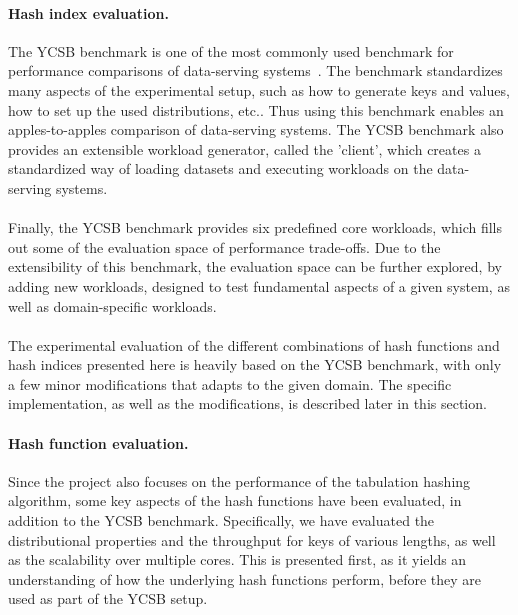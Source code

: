 \documentclass[11pt]{article} %
\begin{document}
\paragraph{Hash index evaluation.} The YCSB benchmark is one of the most commonly used benchmark for performance comparisons of data-serving systems~\cite{BC10}. The benchmark standardizes many aspects of the experimental setup, such as how to generate keys and values, how to set up the used distributions, etc.. Thus using this benchmark enables an apples-to-apples comparison of data-serving systems. The YCSB benchmark also provides an extensible workload generator, called the 'client', which creates a standardized way of loading datasets and executing workloads on the data-serving systems. \\
\\
Finally, the YCSB benchmark provides six predefined core workloads, which fills out some of the evaluation space of performance trade-offs. Due to the extensibility of this benchmark, the evaluation space can be further explored, by adding new workloads, designed to test fundamental aspects of a given system, as well as domain-specific workloads.\\
\\
The experimental evaluation of the different combinations of hash functions and hash indices presented here is heavily based on the YCSB benchmark, with only a few minor modifications that adapts to the given domain. The specific implementation, as well as the modifications, is described later in this section.
\paragraph{Hash function evaluation.}
Since the project also focuses on the performance of the tabulation hashing algorithm, some key aspects of the hash functions have been evaluated, in addition to the YCSB benchmark. Specifically, we have evaluated the distributional properties and the throughput for keys of various lengths, as well as the scalability over multiple cores. This is presented first, as it yields an understanding of how the underlying hash functions perform, before they are used as part of the YCSB setup.
\end{document}
